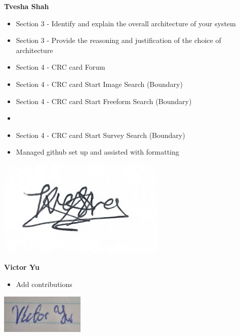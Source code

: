 \documentclass[]{article}
\begin{document}
\textbf{Tvesha Shah}
\begin{itemize}
    \setlength\itemindent{2em}
    \item Section 3 -  Identify and explain the overall architecture of your system  
    \item Section 3 - Provide the reasoning and justification of the choice of architecture 
    \item Section 4 - CRC card Forum 
    \item Section 4 - CRC card Start Image Search (Boundary)
    \item Section 4 - CRC card Start Freeform Search (Boundary)
    \item \item Section 4 - CRC card Start Survey Search (Boundary) 
    \item Managed github set up and assisted with formatting
\end{itemize} 
\includegraphics[width=0.6\textwidth]{Tvesha.png}

\textbf{Victor Yu}
\begin{itemize}
    \setlength\itemindent{2em}
\item Add contributions 
\end{itemize}
\includegraphics[width=0.3\textwidth]{Victor.png}
\end{document}
